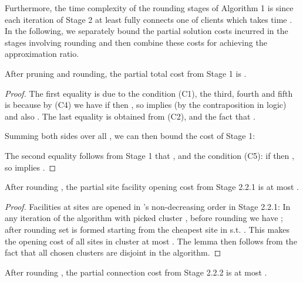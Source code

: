 \documentclass[10pt]{llncs}
\begin{document}
Furthermore, the time complexity of the rounding stages of Algorithm
1 is  since each iteration of Stage 2 at least
fully connects one of  clients which takes time .
In the following, we separately bound the partial solution costs incurred
in the stages involving rounding and then combine these costs for
achieving the approximation ratio.
\begin{lemma}
After pruning and rounding, the partial total cost from Stage 1 is
.
\label{lem:1}\end{lemma}
\begin{proof}





The first equality is due to the condition (C1), the third, fourth
and fifth is because by (C4) we have 
if  then , so 
implies  (by the contraposition in logic) and also
. The last
equality is obtained from (C2), and the fact that .

Summing both sides over all , we can then bound
the cost of Stage 1:





The second equality follows from Stage 1 that ,
and the condition (C5): if  then ,
so  implies .\end{proof}
\begin{lemma}
After rounding , the partial site facility opening
cost from Stage 2.2.1 is at most .
\label{lem: boc}\end{lemma}
\begin{proof}
Facilities at sites 
are opened in 's non-decreasing order in Stage 2.2.1: In any
iteration of the algorithm with picked cluster , before
rounding we have ;
after rounding set  is formed starting from the
cheapest site in  s.t. .
This makes the opening cost of all sites in cluster 
at most . The lemma then follows
from the fact that all chosen clusters are disjoint in the algorithm.\end{proof}
\begin{lemma}
After rounding , the partial connection cost from
Stage 2.2.2 is at most .
\label{lem: conn} \end{lemma}
\end{document}
